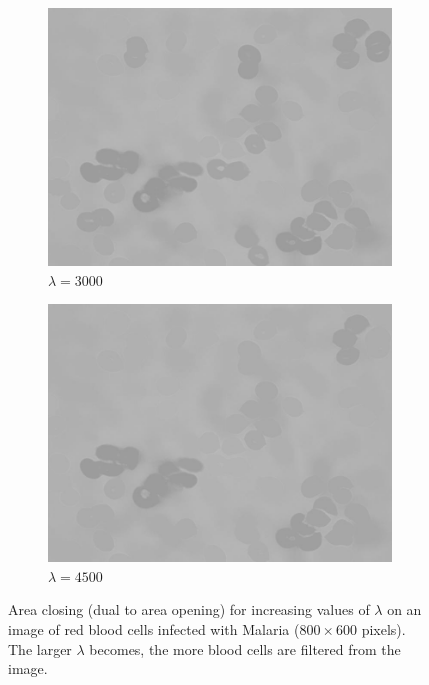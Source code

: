 \begin{figure}
{    \begin{subfigure}{0.25\textwidth}
      \includegraphics[width=\textwidth]{images/area-closing-3000.jpg}
      \caption{$\lambda = 3000$}
      \label{fig:morphology-examples-malaria-3000}
    \end{subfigure}

    \begin{subfigure}{0.25\textwidth}
      \includegraphics[width=\textwidth]{images/area-closing-4500.jpg}
      \caption{$\lambda = 4500$}
      \label{fig:morphology-examples-malaria-4500}
    \end{subfigure}

  } %

  \caption[Area closing (dual to area opening) for increasing values of
  $\lambda$.]{Area closing (dual to area opening) for increasing values of
    $\lambda$ on an image of red blood cells infected with Malaria ($800 \times
    600$ pixels). The larger $\lambda$ becomes, the more blood cells are
    filtered from the image.}
  \label{fig:morphology-examples-malaria}
\end{figure}

